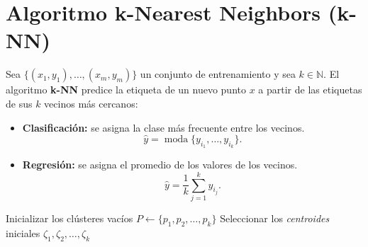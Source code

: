\documentclass[a4,11pt]{aleph-notas}
\begin{document}
\section{Algoritmo k-Nearest Neighbors (k-NN)}


\begin{defi}
Sea \(\{(x_1,y_1),\ldots,(x_m,y_m)\}\) un conjunto de entrenamiento y sea \(k \in \mathbb{N}\).  
El algoritmo \textbf{k-NN} predice la etiqueta de un nuevo punto \(x\) a partir de las etiquetas de sus \(k\) vecinos más cercanos:
\begin{itemize}
    \item \textbf{Clasificación:} se asigna la clase más frecuente entre los vecinos.
    \[
        \hat{y} = \operatorname{moda}\{y_{i_1},\ldots,y_{i_k}\}.
    \]
    \item \textbf{Regresión:} se asigna el promedio de los valores de los vecinos.
    \[
        \hat{y} = \frac{1}{k}\sum_{j=1}^{k} y_{i_j}.
    \]
\end{itemize}
\end{defi}

\begin{algorithm}[H]
    \caption{Pseudocódigo del algoritmo $k$-means}


    Inicializar los clústeres vacíos $P \leftarrow \{p_1, p_2, \dots, p_k\}$\;
    Seleccionar los \emph{centroides} iniciales $\zeta_1, \zeta_2, \dots, \zeta_k$\;
    
\end{algorithm}
\end{document}
